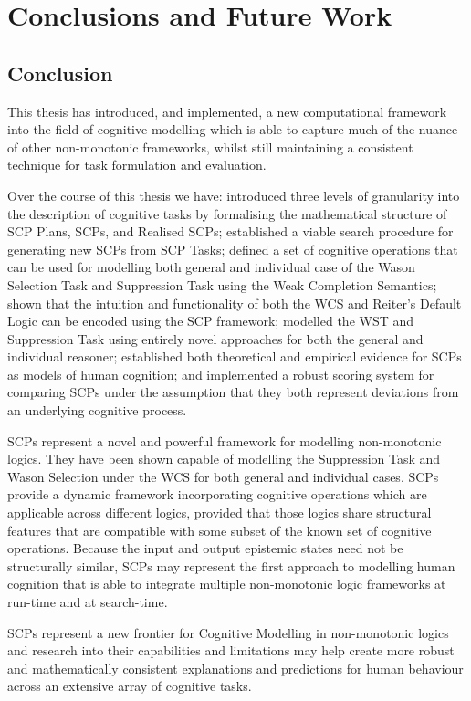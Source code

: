 \chapter{Conclusions and Future Work} \label{chp:conclusion}
\section{Conclusion}
This thesis has introduced, and implemented, a new computational framework into the field of cognitive modelling which is able to capture much of the nuance of other non-monotonic frameworks, whilst still maintaining a consistent technique for task formulation and evaluation. 

Over the course of this thesis we have: introduced three levels of granularity into the description of cognitive tasks by formalising the mathematical structure of SCP Plans, SCPs, and Realised SCPs; established a viable search procedure for generating new SCPs from SCP Tasks; defined a set of cognitive operations that can be used for modelling both general and individual case of the Wason Selection Task and Suppression Task using the Weak Completion Semantics; shown that the intuition and functionality of both the WCS and Reiter's Default Logic can be encoded using the SCP framework; modelled the WST and Suppression Task using entirely novel approaches for both the general and individual reasoner; established both theoretical and empirical evidence for SCPs as models of human cognition; and implemented a robust scoring system for comparing SCPs under the assumption that they both represent deviations from an underlying cognitive process.

SCPs represent a novel and powerful framework for modelling non-monotonic logics. They have been shown capable of modelling the Suppression Task and Wason Selection under the WCS for both general and individual cases. SCPs provide a dynamic framework incorporating cognitive operations which are applicable across different logics, provided that those logics share structural features that are compatible with some subset of the known set of cognitive operations. Because the input and output epistemic states need not be structurally similar, SCPs may represent the first approach to modelling human cognition that is able to integrate multiple non-monotonic logic frameworks at run-time and at search-time. 

SCPs represent a new frontier for Cognitive Modelling in non-monotonic logics and research into their capabilities and limitations may help create more robust and mathematically consistent explanations and predictions for human behaviour across an extensive array of cognitive tasks.

